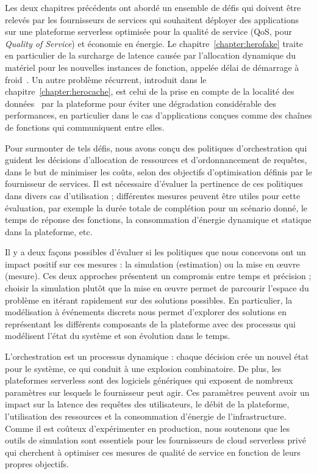 Les deux chapitres précédents ont abordé un ensemble de défis qui doivent être relevés par les fournisseurs de services qui souhaitent déployer des applications sur une plateforme serverless optimisée pour la qualité de service (\gls{QoS}, pour \textit{Quality of Service}) et économie en énergie. Le chapitre~\ref{chapter:herofake} traite en particulier de la surcharge de latence causée par l'allocation dynamique du matériel pour les nouvelles instances de fonction, appelée délai de démarrage à froid~\cite{vahidiniaColdStartServerless2020}. Un autre problème récurrent, introduit dans le chapitre~\ref{chapter:herocache}, est celui de la prise en compte de la localité des données~\cite{yuFollowingDataNot} par la plateforme pour éviter une dégradation considérable des performances, en particulier dans le cas d'applications conçues comme des chaînes de fonctions qui communiquent entre elles.

Pour surmonter de tels défis, nous avons conçu des politiques d'orchestration qui guident les décisions d'allocation de ressources et d'ordonnancement de requêtes, dans le but de minimiser les coûts, selon des objectifs d'optimisation définis par le fournisseur de services. Il est nécessaire d'évaluer la pertinence de ces politiques dans divers cas d'utilisation ; différentes mesures peuvent être utiles pour cette évaluation, par exemple la durée totale de complétion pour un scénario donné, le temps de réponse des fonctions, la consommation d'énergie dynamique et statique dans la plateforme, etc.


Il y a deux façons possibles d'évaluer si les politiques que nous concevons ont un impact positif sur ces mesures : la simulation (estimation) ou la mise en œuvre (mesure). Ces deux approches présentent un compromis entre temps et précision ; choisir la simulation plutôt que la mise en œuvre permet de parcourir l'espace du problème en itérant rapidement sur des solutions possibles. En particulier, la modélisation à événements discrets nous permet d'explorer des solutions en représentant les différents composants de la plateforme avec des processus qui modélisent l'état du système et son évolution dans le temps.

L'orchestration est un processus dynamique : chaque décision crée un nouvel état pour le système, ce qui conduit à une explosion combinatoire. De plus, les plateformes serverless sont des logiciels génériques qui exposent de nombreux paramètres sur lesquels le fournisseur peut agir. Ces paramètres peuvent avoir un impact sur la latence des requêtes des utilisateurs, le débit de la plateforme, l'utilisation des ressources et la consommation d'énergie de l'infrastructure. Comme il est coûteux d'expérimenter en production, nous soutenons que les outils de simulation sont essentiels pour les fournisseurs de cloud serverless privé qui cherchent à optimiser ces mesures de qualité de service en fonction de leurs propres objectifs.

